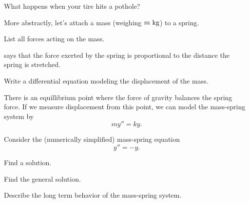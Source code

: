 
\begin{applicationActivities}

\begin{observation}
What happens when your tire hits a pothole?



\end{observation}

\begin{activity}{5}
More abstractly, let's attach a mass (weighing \(m\ {\rm kg}\)) to a spring.

\begin{center}
\springmass
\end{center}
\vfill
List all forces acting on the mass.
\end{activity}

\begin{activity}{5}
 says that the force exerted by the spring is proportional to the distance the spring is stretched.

\begin{center}
\springmass
\end{center}
\vfill
Write a differential equation modeling the displacement of the mass.
\end{activity}

\begin{observation}
There is an equillibrium point where the force of gravity balances the spring force.  If we measure displacement from this point, we can model the mass-spring system by
\[my''=ky.\]
\vfill
\begin{center}
\springmass
\end{center}
\end{observation}

\begin{activity}{15}
Consider the (numerically simplified) mass-spring equation \[y''=-y.\]
\begin{subactivity}
Find a solution.
\end{subactivity}
\begin{subactivity}
Find the general solution.
\end{subactivity}
\begin{subactivity}
Describe the long term behavior of the mass-spring system.
\end{subactivity}
\end{activity}


\end{applicationActivities}
